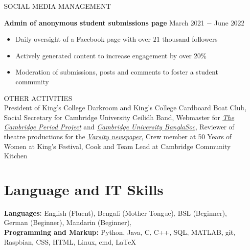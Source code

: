 \documentclass{article}
\begin{document}
\uppercase{Social Media Management}

\textbf{Admin of anonymous student submissions page }\hfill March 2021 $-$ June 2022
\begin{itemize}
    \item Daily oversight of a Facebook page with over 21 thousand followers
    \item Actively generated content to increase engagement by over 20\%
    \item Moderation of submissions, posts and comments to foster a student community
\end{itemize} \medskip

\uppercase{Other Activities}\\
President of King's College Darkroom and King's College Cardboard Boat Club, Social Secretary for Cambridge University Ceilidh Band, Webmaster for \href{http://tcpp.soc.srcf.net/}{\underline{\textit{The Cambridge Period Project}}} and \href{https://cambridgebanglasoc.org/}{\underline{\textit{Cambridge University BanglaSoc}}}, Reviewer of theatre productions for the \href{https://www.varsity.co.uk/profile/sheamol-obeda}{\underline{\textit{Varsity newspaper}}}, Crew member at 50 Years of Women at King's Festival, Cook and Team Lead at Cambridge Community Kitchen

\medskip

\vspace{-.75\baselineskip}
\hrulefill
\vspace{-.75\baselineskip}

\section*{Language and IT Skills}
\textbf{Languages:} English (Fluent), Bengali (Mother Tongue), 
BSL (Beginner),
German (Beginner), 
Mandarin (Beginner),  \\
\textbf{Programming and Markup:} Python, Java, C, C++, SQL, MATLAB, git, Raspbian, CSS, HTML, Linux, cmd, \LaTeX\medskip

\vspace{-.75\baselineskip}
\hrulefill
\vspace{-.75\baselineskip}
\end{document}
